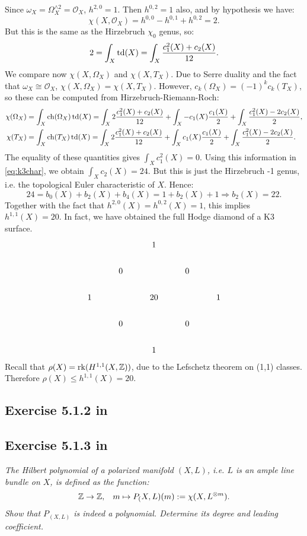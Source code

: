 \documentclass{article}
\begin{document}
Since $\omega_X = \Omega_X^{\wedge 2} = \mathcal{O}_X$, $h^{2,0} = 1$. Then $h^{0,2} = 1$ also, and by hypothesis we have:
\[	\chi(X,\mathcal{O}_X) = h^{0,0} - h^{0,1} + h^{0,2} = 2.	\]
But this is the same as the Hirzebruch $\chi_0$ genus, so:
\begin{equation}
\label{eq:k3char}
	2 = \int_X \operatorname{td}(X) = \int_X \frac{c_1^2(X) + c_2(X)}{12} .
\end{equation}
We compare now $\chi(X,\Omega_X)$ and $\chi(X,T_X)$. Due to Serre duality and the fact that $\omega_X \cong \mathcal{O}_X$,
$\chi(X,\Omega_X) = \chi(X,T_X)$. However, $c_k(\Omega_X) = (-1)^k c_k(T_X)$, so these can be computed from Hirzebruch-Riemann-Roch:
\begin{align*}
\chi(\Omega_X) &= \int_X \operatorname{ch}(\Omega_X) \operatorname{td}(X) = \int_X 2 \frac{c_1^2(X) + c_2(X)}{12} + \int_X -c_1(X) \frac{c_1(X)}{2}
+ \int_X \frac{c_1^2(X) - 2c_2(X)}{2}, \\
\chi(T_X) &= \int_X \operatorname{ch}(T_X) \operatorname{td}(X) = \int_X 2 \frac{c_1^2(X) + c_2(X)}{12} + \int_X c_1(X) \frac{c_1(X)}{2}
+ \int_X \frac{c_1^2(X) - 2c_2(X)}{2}.
\end{align*}
The equality of these quantities gives $\int_X c_1^2(X) = 0$. Using this information in \ref{eq:k3char}, we obtain
$\int_X c_2(X) = 24$. But this is just the Hirzebruch -1 genus, i.e. the topological Euler characteristic of $X$.
Hence:
\[	24 = b_0(X) + b_2(X) + b_4(X) = 1 + b_2(X) + 1 \Longrightarrow b_2(X) = 22.	\]
Together with the fact that $h^{2,0}(X) = h^{0,2}(X) = 1$, this implies $h^{1,1}(X) = 20$. In fact, 
we have obtained the full Hodge diamond of a K3 surface.
\[
\begin{tikzcd}
\; & & 1 & & \\
 &0 &  &0 & \\
1& & 20 & &1 \\
 &0 &  &0 & \\
 & & 1 & &
\end{tikzcd}
\]
Recall that $\rho(X) = \operatorname{rk}(H^{1,1}(X,\mathbb{Z}))$, due to the Lefschetz theorem on (1,1) classes. Therefore
$\rho(X) \leq h^{1,1}(X) = 20$.


\subsection*{Exercise 5.1.2 in \cite{Huy}}


\subsection*{Exercise 5.1.3 in \cite{Huy}}
\emph{The Hilbert polynomial of a polarized manifold $(X,L)$, i.e. $L$ is an ample line bundle on $X$, is defined as the
function:}
\[	\mathbb{Z} \to \mathbb{Z}, \hspace{3mm} m \mapsto P_(X,L)(m):= \chi(X,L^{\otimes m}).	\]
\emph{Show that $P_(X,L)$ is indeed a polynomial. Determine its degree and leading coefficient.}
\vspace{3mm}
\end{document}
